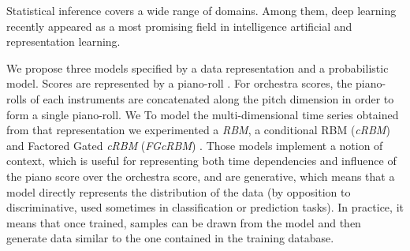\documentclass[letterpaper]{article}
\begin{document}
Statistical inference covers a wide range of domains. Among them, deep learning recently appeared as a most promising field in intelligence artificial and representation learning. 

We propose three models specified by a data representation and a probabilistic model. Scores are represented by a piano-roll . For orchestra scores, the piano-rolls of each instruments are concatenated along the pitch dimension in order to form a single piano-roll. We To model the multi-dimensional time series obtained from that representation we experimented a \textit{RBM}, a conditional RBM (\textit{cRBM}) and Factored Gated \textit{cRBM} (\textit{FGcRBM}) \cite{taylor2009composable}.
Those models implement a notion of context, which is useful for representing both time dependencies and influence of the piano score over the orchestra score, and are generative, which means that a model directly represents the distribution of the data (by opposition to discriminative, used sometimes in classification or prediction tasks). In practice, it means that once trained, samples can be drawn from the model and then generate data similar to the one contained in the training database.

\end{document}
